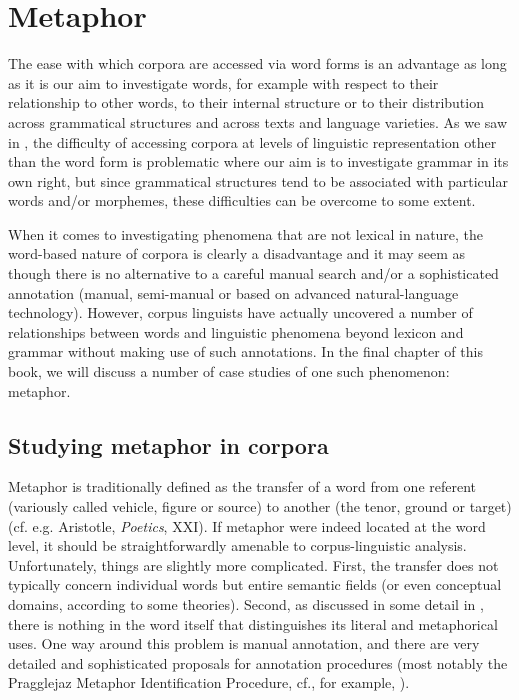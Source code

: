 \chapter{Metaphor}
\label{ch:metaphorandmetonymy}

The ease with which corpora are accessed via word forms is an advantage as long as it is our aim to investigate words, for example with respect to their relationship to other words, to their internal structure or to their distribution  across grammatical  structures and across texts and language varieties.  As we saw in , the difficulty of accessing corpora at levels of linguistic representation other than the word form is problematic where our aim is to investigate grammar in its own right, but since grammatical structures tend to be associated  with particular words and\slash or morphemes,  these difficulties can be overcome to some extent.

When it comes to investigating phenomena that are not lexical in nature, the word\hyp{}based nature of corpora is clearly a disadvantage and it may seem as though there is no alternative to a careful manual  search and\slash or a sophisticated annotation  (manual, semi\hyp{}manual or based on advanced natural\hyp{}language technology). However, corpus linguists have actually uncovered a number of relationships between words and linguistic phenomena beyond lexicon  and grammar  without making use of such annotations.  In the final chapter of this book, we will discuss a number of case studies of one such phenomenon:  metaphor.

\section{Studying metaphor in corpora}
\label{sec:studyingmetaphorincorpora}

Metaphor  is traditionally defined as the transfer of a word from one referent (variously called vehicle, figure or source) to another (the tenor, ground or target) (cf. e.g. Aristotle, \textit{Poetics}, XXI). If metaphor were indeed located at the word level, it should be straightforwardly amenable to corpus\hyp{}linguistic analysis. Unfortunately, things are slightly more complicated. First, the transfer does not typically concern individual words but entire semantic  fields (or even conceptual  domains, according to some theories). Second, as discussed in some detail in , there is nothing in the word itself that distinguishes its literal  and metaphorical uses. One way around this problem is manual  annotation,  and there are very detailed and sophisticated proposals for annotation procedures (most notably the Pragglejaz Metaphor Identification Procedure, cf., for example, \citet{low_pragglejaz_2010}).


